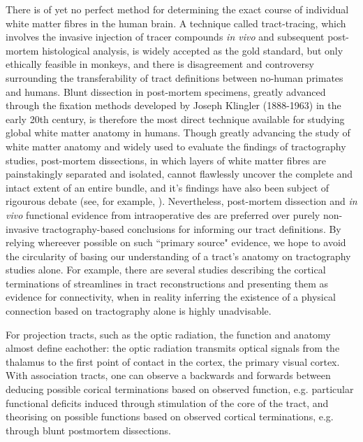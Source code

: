 There is of yet no perfect method for determining the exact course of individual white matter fibres in the human brain.
A technique called tract-tracing, which involves the invasive injection of tracer compounds \textit{in vivo} and subsequent post-mortem histological analysis, is widely accepted as the gold standard, but only ethically feasible in monkeys, and there is disagreement and controversy surrounding the transferability of tract definitions between no-human primates and humans.\autocite{Becker2022,ThiebautdeSchotten2012}
Blunt dissection in post-mortem specimens, greatly advanced through the fixation methods developed by Joseph Klingler (1888-1963) in the early 20th century,\autocite{Agrawal2011} is therefore the most direct technique available for studying global white matter anatomy in humans.
Though greatly advancing the study of white matter anatomy and widely used to evaluate the findings of tractography studies, post-mortem dissections, in which layers of white matter fibres are painstakingly separated and isolated, cannot flawlessly uncover the complete and intact extent of an entire bundle,\autocite{Martino2010, Dick2012} and it's findings have also been subject of rigourous debate (see, for example, \textcite{Giampiccolo2022a,Becker2022,Giampiccolo2022b}).
Nevertheless, post-mortem dissection and \textit{in vivo} functional evidence from intraoperative \gls{des} are preferred over purely non-invasive tractography-based conclusions for informing our tract definitions.
By relying whereever possible on such ``primary source" evidence, we hope to avoid the circularity of basing our understanding of a tract's anatomy on tractography studies alone.
For example, there are several studies describing the cortical terminations of streamlines in tract reconstructions and presenting them as evidence for connectivity,\autocite{Conner2018,Hau2016} when in reality inferring the existence of a physical connection based on tractography alone is highly unadvisable.\autocite{Rheault2020}

For projection tracts, such as the optic radiation, the function and anatomy almost define eachother: the optic radiation transmits optical signals from the thalamus to the first point of contact in the cortex, the primary visual cortex.
With association tracts, one can observe a backwards and forwards between deducing possible corical terminations based on observed function, e.g. particular functional deficits induced through stimulation of the core of the tract, and theorising on possible functions based on observed cortical terminations, e.g. through blunt postmortem dissections.

